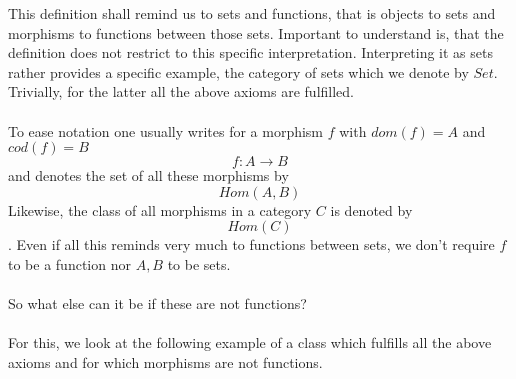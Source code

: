 \documentclass[17pt]{extarticle}
\begin{document}
This definition shall remind us to sets and functions, that is objects to sets and morphisms to
functions between those sets. Important to understand is, that the definition does not restrict to
this specific interpretation. Interpreting it as sets rather provides a specific example, the category of sets which we denote by $Set$. Trivially, for the latter all the above axioms are fulfilled.\\ \\

To ease notation one usually writes for a morphism $f$ with $dom(f)=A$ and $cod(f)=B$
$$
f:A\rightarrow B
$$
and denotes the set of all these morphisms by
$$Hom(A,B)$$
Likewise, the class of all morphisms in a category $C$ is denoted by
$$Hom(C)$$.
Even if all this reminds very much  to functions between sets, we don't require $f$ to be a function nor
$A, B$ to be sets.\\ \\
So what else can it be if these are not functions?\\ \\
For this, we look at the following example of a class which fulfills all the above axioms and for which
morphisms are not functions.\\ \\
\end{document}
